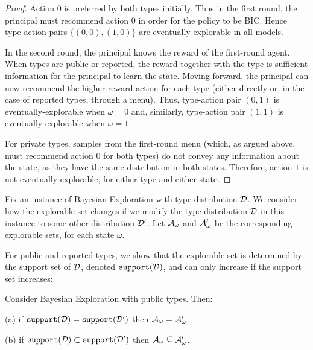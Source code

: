 \begin{proof}
Action 0 is preferred by both types initially. Thus in the first round, the principal must recommend action $0$ in order for the policy to be BIC.  Hence type-action pairs $\{(0,0),(1,0)\}$ are eventually-explorable in all models.

In the second round, the principal knows the reward of the first-round agent.  When types are public or reported, the reward together with the type is sufficient information for the principal to learn the state.  Moving forward, the principal can now recommend the higher-reward action for each type (either directly or, in the case of reported types, through a menu).  Thus, type-action pair $(0,1)$ is eventually-explorable when $\omega=0$ and, similarly, type-action pair $(1,1)$ is eventually-explorable when $\omega=1$.

For private types, samples from the first-round menu (which, as argued above, must recommend action $0$ for both types) do not convey any information about the state, as they have the same distribution in both states. Therefore, action $1$ is not eventually-explorable, for either type and either state.
\end{proof}

Fix an instance of Bayesian Exploration with type distribution $\mathcal{D}$. We consider how the explorable set changes if we modify the type distribution $\mathcal{D}$ in this instance to some other distribution $\mathcal{D}'$. Let $\mathcal{A}_{\omega}$ and $\mathcal{A}_{\omega}'$ be the corresponding explorable sets, for each state $\omega$.


For public and reported types, we show that the explorable set is determined by the support set of $\mathcal{D}$, denoted $\mathtt{support}(\mathcal{D})$, and can only increase if the support set increases:

\begin{claim}\label{cl:statics-diversity-public}
Consider Bayesian Exploration with public types. Then:
\begin{OneLiners}
\item[(a)] if $\mathtt{support}(\mathcal{D})=\mathtt{support}(\mathcal{D}')$ then $\mathcal{A}_{\omega}=\mathcal{A}_{\omega}'$.
\item[(b)] if $\mathtt{support}(\mathcal{D})\subset \mathtt{support}(\mathcal{D}')$ then $\mathcal{A}_{\omega}\subseteq \mathcal{A}_{\omega}'$.
\end{OneLiners}
\end{claim}


